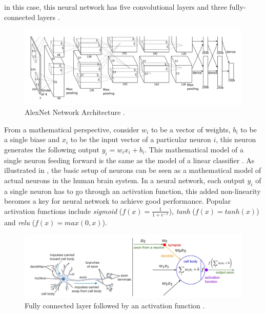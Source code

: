 \documentclass[a4paper,12pt]{report}
\begin{document}
in this case, this neural network has five convolutional layers and three fully-connected
layers \cite{Krizhevsky}.
\begin{figure}[!h]
  \includegraphics[width=\textwidth]{fig_alexnet.png}
  \caption{AlexNet Network Architecture \cite{Krizhevsky}.}
  \label{fig:alexnet}
\end{figure}

From a mathematical perspective, consider $w_{i}$ to be a vector of weights, $b_{i}$ to be a single biase and $x_{i}$
to be the input vector of a particular neuron $i$, this neuron generates the
following output $y_{i} = w_{i}x_{i} + b_{i}$.
This mathematical model of a single neuron feeding forward is the same as the
model of a linear classifier \cite{Mladenic}.
As illustrated in , the basic setup of neurons can be seen as
a mathematical model of actual neurons in the human brain system.
In a neural network, each output $y_{i}$ of a single neuron has to go through
an activation function, this added non-linearity becomes a key for neural network
to achieve good performance.
Popular activation functions include \textit{sigmoid} ($f(x) = \frac{1}{1+e^{-x}}$),
\textit{tanh} ($f(x) = tanh(x)$) and \textit{relu} ($f(x) = max(0,x)$).

\begin{figure}[!ht]
  \includegraphics[width=\textwidth]{fig_neuron.png}
  \caption{Fully connected layer followed by an activation function \cite{Krizhevsky}.}
  \label{fig:neuron}
\end{figure}
\end{document}
